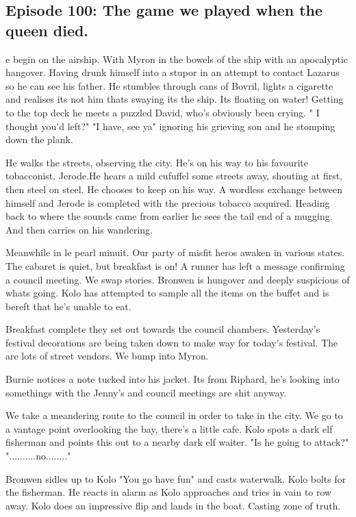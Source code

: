 \subsection{Episode 100: The game we played when the queen died.}

e begin on the airship. With Myron in the bowels of the ship with an apocalyptic hangover. Having drunk himself into a stupor in an attempt to contact Lazarus so he can see his father. He stumbles through cans of Bovril, lights a cigarette and realises its not him thats swaying its the ship. Its floating on water! Getting to the top deck he meets a puzzled David, who's obviously been crying. " I thought you'd left?" "I have, see ya" ignoring his grieving son and he stomping down the plank.\medskip

He walks the streets, observing the city. He's on his way to his favourite tobacconist, Jerode.He hears a mild cufuffel some streets away, shouting at first, then steel on steel. He chooses to keep on his way. A wordless exchange between himself and Jerode is completed with the precious tobacco acquired. Heading back to where the sounds came from earlier he sees the tail end of a mugging. And then carries on his wandering.\medskip

Meanwhile in le pearl minuit. Our party of misfit heros awaken in various states. The cabaret is quiet, but breakfast is on! A runner has left a message confirming a council meeting. We swap stories. Bronwen is hungover and deeply suspicious of whats going. Kolo has attempted to sample all the items on the buffet and is bereft that he's unable to eat.\medskip

Breakfast complete they set out towards the council chambers. Yesterday's festival decorations are being taken down to make way for today's festival. The are lots of street vendors. We bump into Myron.\medskip

Burnie notices a note tucked into his jacket. Its from Riphard, he's looking into somethings with the Jenny's and council meetings are shit anyway.\medskip

We take a meandering route to the council in order to take in the city. We go to a vantage point overlooking the bay, there's a little cafe. Kolo spots a dark elf fisherman and points this out to a nearby dark elf waiter. "Is he going to attack?" "..........no........"\medskip

Bronwen sidles up to Kolo "You go have fun" and casts waterwalk. Kolo bolts for the fisherman. He reacts in alarm as Kolo approaches and tries in vain to row away. Kolo does an impressive flip and lands in the boat. Casting zone of truth.\medskip

